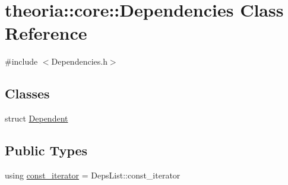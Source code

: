 \hypertarget{classtheoria_1_1core_1_1Dependencies}{}\section{theoria\+:\+:core\+:\+:Dependencies Class Reference}
\label{classtheoria_1_1core_1_1Dependencies}


{\ttfamily \#include $<$Dependencies.\+h$>$}

\subsection*{Classes}
\begin{DoxyCompactItemize}
\item 
struct \hyperlink{structtheoria_1_1core_1_1Dependencies_1_1Dependent}{Dependent}
\end{DoxyCompactItemize}
\subsection*{Public Types}
\begin{DoxyCompactItemize}
\item 
using \hyperlink{classtheoria_1_1core_1_1Dependencies_af58b879e807df8fb52b96c9ab1eb6073}{const\+\_\+iterator} = Deps\+List\+::const\+\_\+iterator
\end{DoxyCompactItemize}
